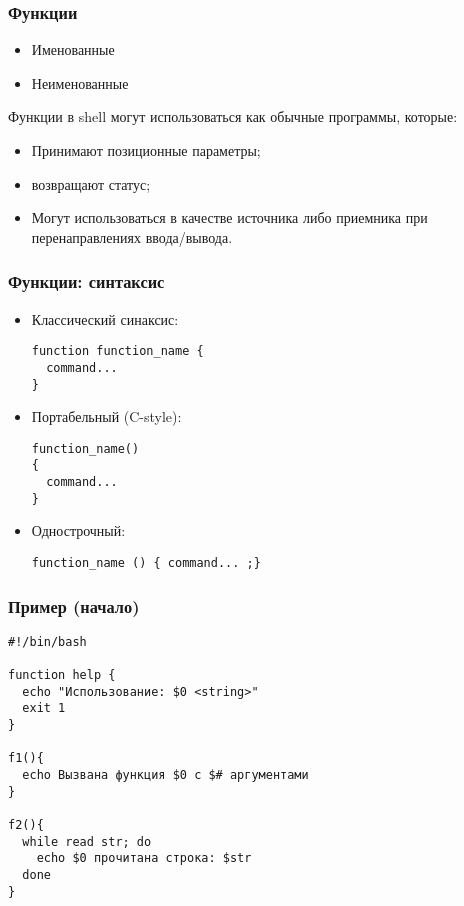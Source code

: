 \begin{frame}
	\frametitle{Функции}

	\begin{itemize}
		\item Именованные
		\item Неименованные
	\end{itemize}

	Функции в shell могут использоваться как обычные программы, которые:
	\begin{itemize}
		\item Принимают позиционные параметры;
		\item возвращают статус;
		\item Могут использоваться в качестве источника либо приемника 
			при перенаправлениях ввода/вывода.
	\end{itemize}

\end{frame}


\begin{frame}[fragile]
	\frametitle{Функции: синтаксис}
	\begin{itemize}
		\item Классический синаксис: 
			\begin{lstlisting}
function function_name {
  command...
} 
			\end{lstlisting}
		\item Портабельный (C-style):
			\begin{lstlisting}
function_name()
{
  command...
} 
			\end{lstlisting}

		\item Однострочный:
			\begin{lstlisting}
function_name () { command... ;}
			\end{lstlisting}
  \end{itemize}
\end{frame}

\begin{frame}[fragile]
	\frametitle{Пример (начало)}
	\small
	\begin{lstlisting}
#!/bin/bash

function help {
  echo "Использование: $0 <string>"
  exit 1
}

f1(){
  echo Вызвана функция $0 с $# аргументами
}

f2(){
  while read str; do
    echo $0 прочитана строка: $str
  done
}
	\end{lstlisting}

\end{frame}



